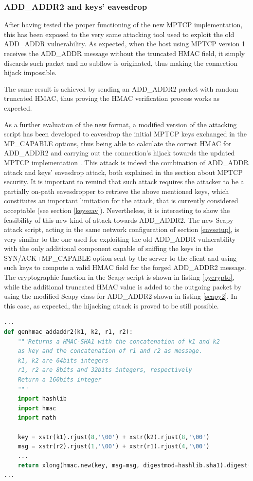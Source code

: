 \subsubsection{ADD\_ADDR2 and keys' eavesdrop}
After having tested the proper functioning of the new MPTCP implementation, this has been exposed to the very same attacking tool used to exploit the old ADD\_ADDR vulnerability. As expected, when the host using MPTCP version 1 receives the ADD\_ADDR message without the truncated HMAC field, it simply discards such packet and no subflow is originated, thus making the connection hijack impossible.

The same result is achieved by sending an ADD\_ADDR2 packet with random truncated HMAC, thus proving the HMAC verification process works as expected.

As a further evaluation of the new format, a modified version of the attacking script has been developed to eavesdrop the initial MPTCP keys exchanged in the MP\_CAPABLE options, thus being able to calculate the correct HMAC for ADD\_ADDR2 and carrying out the connection's hijack towards the updated MPTCP implementation \cite{add-addr2-eav}. This attack is indeed the combination of ADD\_ADDR attack and keys' eavesdrop attack, both explained in the section about MPTCP security.
It is important to remind that such attack requires the attacker to be a partially on-path eavesdropper to retrieve the above mentioned keys, which constitutes an important limitation for the attack, that is currently considered acceptable (see section \ref{keyseav}). Nevertheless, it is interesting to show the feasibility of this new kind of attack towards ADD\_ADDR2. The new Scapy attack script, acting in the same network configuration of section \ref{envsetup}, is very similar to the one used for exploiting the old ADD\_ADDR vulnerability with the only additional component capable of sniffing the keys in the SYN/ACK+MP\_CAPABLE option sent by the server to the client and using such keys to compute a valid HMAC field for the forged ADD\_ADDR2 message. The cryptographic function in the Scapy script is shown in listing \ref{pycrypto}, while the additional truncated HMAC value is added to the outgoing packet by using the modified Scapy class for ADD\_ADDR2 shown in listing \ref{scapy2}. In this case, as expected, the hijacking attack is proved to be still possible.

\begin{lstlisting}[language=Python, caption=\textit{HMAC calculation in Python}, label=pycrypto]
...
def genhmac_addaddr2(k1, k2, r1, r2):
    """Returns a HMAC-SHA1 with the concatenation of k1 and k2
    as key and the concatenation of r1 and r2 as message.
    k1, k2 are 64bits integers
    r1, r2 are 8bits and 32bits integers, respectively
    Return a 160bits integer
    """
    import hashlib
    import hmac
    import math

    key = xstr(k1).rjust(8,'\00') + xstr(k2).rjust(8,'\00')
    msg = xstr(r2).rjust(1,'\00') + xstr(r1).rjust(4,'\00')
    ...
    return xlong(hmac.new(key, msg=msg, digestmod=hashlib.sha1).digest())
...
\end{lstlisting}

